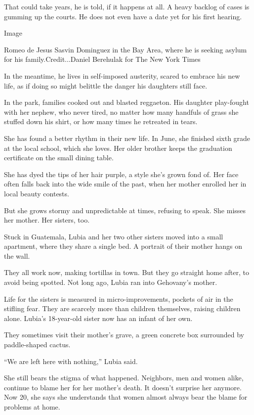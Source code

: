 That could take years, he is told, if it happens at all. A heavy backlog
of cases is gumming up the courts. He does not even have a date yet for
his first hearing.

Image

Romeo de Jesus Sasvin Dominguez in the Bay Area, where he is seeking
asylum for his family.Credit...Daniel Berehulak for The New York Times

In the meantime, he lives in self-imposed austerity, scared to embrace
his new life, as if doing so might belittle the danger his daughters
still face.

In the park, families cooked out and blasted reggaeton. His daughter
play-fought with her nephew, who never tired, no matter how many
handfuls of grass she stuffed down his shirt, or how many times he
retreated in tears.

She has found a better rhythm in their new life. In June, she finished
sixth grade at the local school, which she loves. Her older brother
keeps the graduation certificate on the small dining table.

She has dyed the tips of her hair purple, a style she's grown fond of.
Her face often falls back into the wide smile of the past, when her
mother enrolled her in local beauty contests.

But she grows stormy and unpredictable at times, refusing to speak. She
misses her mother. Her sisters, too.

Stuck in Guatemala, Lubia and her two other sisters moved into a small
apartment, where they share a single bed. A portrait of their mother
hangs on the wall.

They all work now, making tortillas in town. But they go straight home
after, to avoid being spotted. Not long ago, Lubia ran into Gehovany's
mother.

Life for the sisters is measured in micro-improvements, pockets of air
in the stifling fear. They are scarcely more than children themselves,
raising children alone. Lubia's 18-year-old sister now has an infant of
her own.

They sometimes visit their mother's grave, a green concrete box
surrounded by paddle-shaped cactus.

``We are left here with nothing,'' Lubia said.

She still bears the stigma of what happened. Neighbors, men and women
alike, continue to blame her for her mother's death. It doesn't surprise
her anymore. Now 20, she says she understands that women almost always
bear the blame for problems at home.

